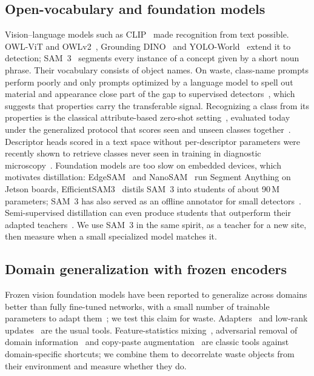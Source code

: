 \documentclass[pdflatex,sn-basic,Numbered]{sn-jnl}%
\begin{document}
\subsection{Open-vocabulary and foundation models}\label{sec:rel-open}
Vision--language models such as CLIP~\cite{radford2021clip} made recognition from text possible. OWL-ViT and OWLv2~\cite{minderer2022owlvit,minderer2023owlv2}, Grounding DINO~\cite{liu2024groundingdino} and YOLO-World~\cite{cheng2024yoloworld} extend it to detection; SAM~3~\cite{carion2025sam3} segments every instance of a concept given by a short noun phrase. Their vocabulary consists of object names. On waste, class-name prompts perform poorly and only prompts optimized by a language model to spell out material and appearance close part of the gap to supervised detectors~\cite{abid2025robustwaste}, which suggests that properties carry the transferable signal. Recognizing a class from its properties is the classical attribute-based zero-shot setting~\cite{lampert2014dap}, evaluated today under the generalized protocol that scores seen and unseen classes together~\cite{xian2019gzsl,chao2016gzsl}. Descriptor heads scored in a text space without per-descriptor parameters were recently shown to retrieve classes never seen in training in diagnostic microscopy~\cite{anon_mirf}. Foundation models are too slow on embedded devices, which motivates distillation: EdgeSAM~\cite{zhou2023edgesam} and NanoSAM~\cite{nanosam2023} run Segment Anything on Jetson boards, EfficientSAM3~\cite{zeng2025efficientsam3} distils SAM~3 into students of about 90\,M parameters; SAM~3 has also served as an offline annotator for small detectors~\cite{faria2026sam3pig}. Semi-supervised distillation can even produce students that outperform their adapted teachers~\cite{taghavi2026student}. We use SAM~3 in the same spirit, as a teacher for a new site, then measure when a small specialized model matches it.

\subsection{Domain generalization with frozen encoders}\label{sec:rel-dg}
Frozen vision foundation models have been reported to generalize across domains better than fully fine-tuned networks, with a small number of trainable parameters to adapt them~\cite{wei2024rein}; we test this claim for waste. Adapters~\cite{houlsby2019adapters} and low-rank updates~\cite{hu2022lora} are the usual tools. Feature-statistics mixing~\cite{zhou2021mixstyle}, adversarial removal of domain information~\cite{ganin2015grl} and copy-paste augmentation~\cite{ghiasi2021copypaste} are classic tools against domain-specific shortcuts; we combine them to decorrelate waste objects from their environment and measure whether they do.
\end{document}
